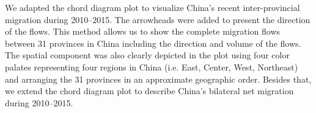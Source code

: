 We adapted the chord diagram plot to visualize China’s recent inter-provincial migration during 2010–2015. The arrowheads were added to present the direction of the flows. This method allows us to show the complete migration flows between 31 provinces in China including the direction and volume of the flows. The spatial component was also clearly depicted in the plot using four color palates representing four regions in China (i.e. East, Center, West, Northeast) and arranging the 31 provinces in an approximate geographic order. Besides that, we extend the chord diagram plot to describe China’s bilateral net migration during 2010–2015.